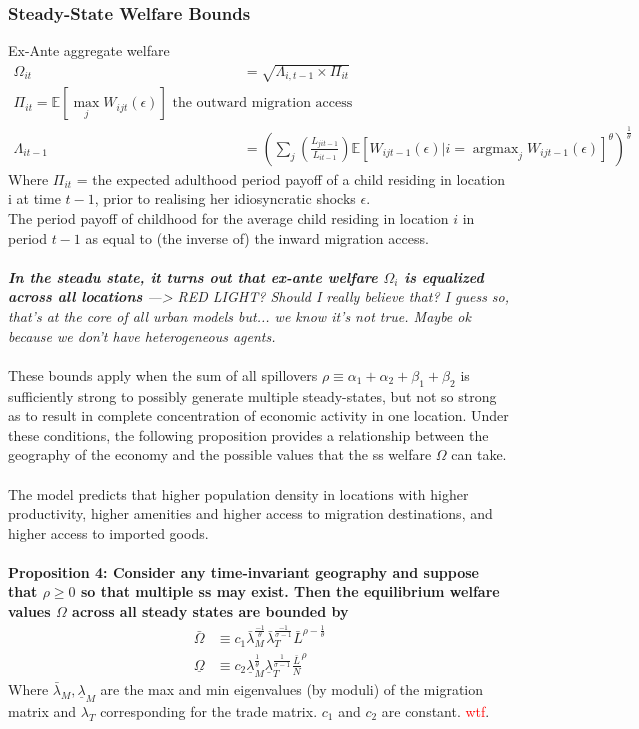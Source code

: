 \documentclass[10pt, final]{article}
\DeclareMathOperator{\argmax}{argmax}
\begin{document}
\subsubsection{Steady-State Welfare Bounds}
Ex-Ante aggregate welfare 
\begin{align*}
    \Omega_{it} &= \sqrt{\Lambda_{i,t-1} \times \Pi_{it}} \\
    \Pi_{it} = \mathbb{E}[\max_j W_{ijt}(\epsilon)] \text{ the outward migration access}\\
    \Lambda_{it-1} &= (\sum_j (\frac{L_{jit-1}}{L_{it-1}}) \mathbb{E}[W_{ijt-1}(\epsilon) | i = \argmax_j W_{ijt-1}(\epsilon)]^\theta)^{\frac{1}{\theta}}
\end{align*}
Where $\Pi_{it}$ = the expected adulthood period payoff of a child residing in location i at time $t-1$, prior to realising her idiosyncratic shocks $\epsilon$.
\\
The period payoff of childhood for the average child residing in location $i$ in period $t-1$ as equal to (the inverse of) the inward migration access.
\\
\\
\textit{\textbf{In the steadu state, it turns out that ex-ante welfare $\Omega_i$ is equalized across all locations} ---> RED LIGHT? Should I really believe that? I guess so, that's at the core of all urban models but... we know it's not true. Maybe ok because we don't have heterogeneous agents.}
\\
\\
These bounds apply when the sum of all spillovers $\rho \equiv \alpha_1 + \alpha_2 + \beta_1 + \beta_2$ is sufficiently strong to possibly generate multiple steady-states, but not so strong as to result in complete concentration of economic activity in one location. Under these conditions, the following proposition provides a relationship between the geography of the economy and the possible values that the ss welfare $\Omega$ can take.
\\
\\
The model predicts that higher population density in locations with higher productivity, higher amenities and higher access to migration destinations, and higher access to imported goods.
\\
\\
\textbf{Proposition 4: Consider any time-invariant geography and suppose that $\rho \geq 0$ so that multiple ss may exist. Then the equilibrium welfare values $\Omega$ across all steady states are bounded by}
\begin{align*}
    \bar{\Omega} &\equiv c_1 \bar{\lambda}_M^{\frac{-1}{\theta}} \bar{\lambda}_T ^{\frac{-1}{\sigma-1}} \bar{L}^{\rho - \frac{1}{\theta}} \\
    \underline{\Omega} &\equiv c_2 \underline{\lambda}_M^{\frac{1}{\theta}} \underline{\lambda}_T ^{\frac{1}{\sigma-1}} \frac{\bar{L}}{N}^{\rho}
\end{align*}
Where $\bar{\lambda}_M,\underline{\lambda}_M$ are the max and min eigenvalues (by moduli) of the migration matrix and $\lambda_T$ corresponding for the trade matrix. $c_1$ and $c_2$ are constant. \textcolor{red}{wtf}.
\\
\\
\end{document}
